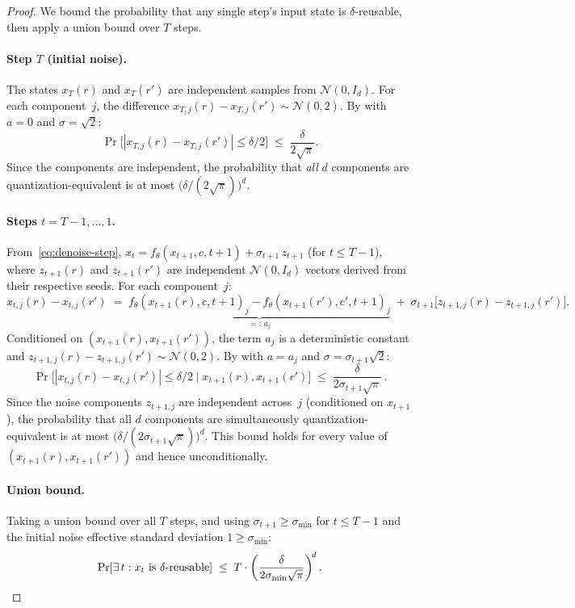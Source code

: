 \documentclass[11pt]{article}
\begin{document}
\begin{proof}
We bound the probability that any single step's input state is $\delta$-reusable, then apply a union bound over $T$ steps.

\paragraph{Step $T$ (initial noise).}
The states $x_T(r)$ and $x_T(r')$ are independent samples from $\mathcal{N}(0, I_d)$. For each component~$j$, the difference $x_{T,j}(r) - x_{T,j}(r') \sim \mathcal{N}(0, 2)$. By  with $a = 0$ and $\sigma = \sqrt{2}$:
\[
    \Pr\!\bigl[|x_{T,j}(r) - x_{T,j}(r')| \leq \delta/2\bigr] \;\leq\; \frac{\delta}{2\sqrt{\pi}}.
\]
Since the components are independent, the probability that \emph{all} $d$ components are quantization-equivalent is at most $\bigl(\delta/(2\sqrt{\pi})\bigr)^d$.

\paragraph{Steps $t = T{-}1, \ldots, 1$.}
From~\eqref{eq:denoise-step}, $x_t = f_\theta(x_{t+1}, c, t{+}1) + \sigma_{t+1}\, z_{t+1}$ (for $t \leq T{-}1$), where $z_{t+1}(r)$ and $z_{t+1}(r')$ are independent $\mathcal{N}(0, I_d)$ vectors derived from their respective seeds. For each component~$j$:
\[
    x_{t,j}(r) - x_{t,j}(r') \;=\; \underbrace{f_\theta(x_{t+1}(r), c, t{+}1)_j - f_\theta(x_{t+1}(r'), c', t{+}1)_j}_{=:\, a_j} \;+\; \sigma_{t+1}\bigl[z_{t+1,j}(r) - z_{t+1,j}(r')\bigr].
\]
Conditioned on $(x_{t+1}(r), x_{t+1}(r'))$, the term $a_j$ is a deterministic constant and $z_{t+1,j}(r) - z_{t+1,j}(r') \sim \mathcal{N}(0, 2)$. By  with $a = a_j$ and $\sigma = \sigma_{t+1}\sqrt{2}$:
\[
    \Pr\!\bigl[|x_{t,j}(r) - x_{t,j}(r')| \leq \delta/2 \;\big|\; x_{t+1}(r), x_{t+1}(r')\bigr] \;\leq\; \frac{\delta}{2\sigma_{t+1}\sqrt{\pi}}\,.
\]
Since the noise components $z_{t+1,j}$ are independent across~$j$ (conditioned on $x_{t+1}$), the probability that all $d$ components are simultaneously quantization-equivalent is at most $\bigl(\delta/(2\sigma_{t+1}\sqrt{\pi})\bigr)^d$. This bound holds for every value of $(x_{t+1}(r), x_{t+1}(r'))$ and hence unconditionally.

\paragraph{Union bound.}
Taking a union bound over all $T$ steps, and using $\sigma_{t+1} \geq \sigma_{\min}$ for $t \leq T{-}1$ and the initial noise effective standard deviation $1 \geq \sigma_{\min}$:
\[
    \Pr[\exists\, t : x_t \text{ is } \delta\text{-reusable}] \;\leq\; T \cdot \left(\frac{\delta}{2\sigma_{\min}\sqrt{\pi}}\right)^{\!d}. \qedhere
\]
\end{proof}
\end{document}
